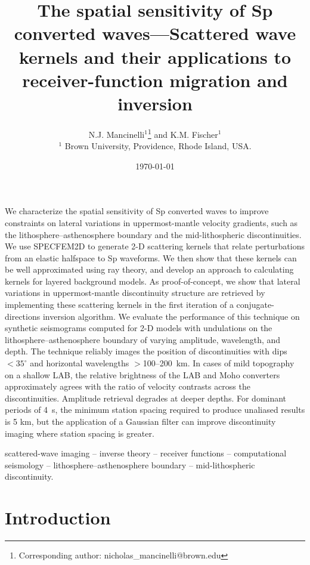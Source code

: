 \documentclass[referee]{gji}
\title[Sp Receiver-Function Sensitivity]
  {The spatial sensitivity of Sp converted waves---Scattered wave kernels
  and their applications to receiver-function migration and inversion}
\author[Mancinelli \& Fischer]
  {N.J. Mancinelli$^1$\thanks{Corresponding author: nicholas\_mancinelli@brown.edu}
  and K.M. Fischer$^1$ \\
  $^1$ Brown University, Providence, Rhode Island, USA.
  }
\date{\today}
\begin{document}
\label{firstpage}

\maketitle

\begin{summary}
We characterize the spatial sensitivity of Sp converted waves to improve constraints on lateral variations in uppermost-mantle velocity gradients, such as the lithosphere--asthenosphere boundary and the mid-lithospheric discontinuities. We use SPECFEM2D to generate 2-D scattering kernels that relate perturbations from an elastic halfspace to Sp waveforms. We then show that these kernels can be well approximated using ray theory, and develop an approach to calculating kernels for layered background models.  As proof-of-concept, we show that lateral variations in uppermost-mantle discontinuity structure are retrieved by implementing these scattering kernels in the first iteration of a conjugate-directions inversion algorithm.  We evaluate the performance of this technique on synthetic seismograms computed for 2-D models with undulations on the lithosphere--asthenosphere boundary of varying amplitude, wavelength, and depth. The technique reliably images the position of discontinuities with dips $<35^\circ$ and horizontal wavelengths $>$100--200~km.  In cases of mild topography on a shallow LAB, the relative brightness of the LAB and Moho converters approximately agrees with the ratio of velocity contrasts across the discontinuities.  Amplitude retrieval degrades at deeper depths. For dominant periods of 4~s, the minimum station spacing required to produce unaliased results is 5 km, but the application of a Gaussian filter can improve discontinuity imaging where station spacing is greater.

\end{summary}

\begin{keywords}
 scattered-wave imaging -- inverse theory -- receiver functions -- computational seismology -- lithosphere--asthenosphere boundary -- mid-lithospheric discontinuity.
\end{keywords}

\newcommand{\vp}{v_p}
\newcommand{\vs}{v_s}

\section{Introduction}
\end{document}
